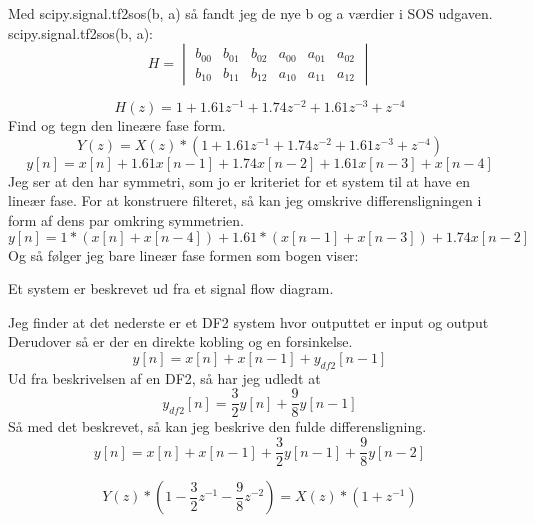 \begin{Opgaver}
\begin{kapitel}
\begin{Opgave}
            Med scipy.signal.tf2sos(b, a) så fandt jeg de nye b og a værdier i SOS udgaven. \\
            scipy.signal.tf2sos(b, a): 
            \[H =  
                \begin{vmatrix}
                    b_{00} & b_{01} & b_{02} & a_{00} & a_{01} & a_{02} \\
                    b_{10} & b_{11} & b_{12} & a_{10} & a_{11} & a_{12}
                \end{vmatrix}
            \]
        \end{Opgave}
        \begin{Opgave}
            \[H(z) = 1 + 1.61z^{-1} + 1.74z^{-2} + 1.61z^{-3} + z^{-4}\]
            Find og tegn den lineære fase form. 
            \[Y(z) = X(z) * (1 + 1.61z^{-1} + 1.74z^{-2} + 1.61z^{-3} + z^{-4})\]
            \[y[n] = x[n] + 1.61x[n - 1] + 1.74x[n - 2] + 1.61x[n - 3] + x[n - 4]\]
            Jeg ser at den har symmetri, som jo er kriteriet for et system til at have en lineær fase. 
            For at konstruere filteret, så kan jeg omskrive differensligningen i form af dens par omkring symmetrien. 
            \[y[n] = 1 * (x[n] + x[n - 4]) + 1.61 * (x[n - 1] + x[n - 3])  + 1.74x[n - 2]\]
            Og så følger jeg bare lineær fase formen som bogen viser: 
        \end{Opgave}
        \begin{Opgave}[Opgave 9.28]
            Et system er beskrevet ud fra et signal flow diagram. 
            \begin{UnderOpgave}
                Jeg finder at det nederste er et DF2 system hvor outputtet er input og output
                Derudover så er der en direkte kobling og en forsinkelse. 
                \[y[n] = x[n] + x[n - 1] + y_{df2}[n - 1]\]
                Ud fra beskrivelsen af en DF2, så har jeg udledt at 
                \[y_{df2}[n] = \frac{3}{2}y[n] + \frac{9}{8}y[n - 1]\]
                Så med det beskrevet, så kan jeg beskrive den fulde differensligning. 
                \[y[n] = x[n] + x[n - 1] + \frac{3}{2}y[n - 1] + \frac{9}{8}y[n - 2]\]
            \end{UnderOpgave}
            \begin{UnderOpgave}
                \[Y(z)*(1 - \frac{3}{2}z^{-1} -\frac{9}{8}z^{-2}) = X(z)*(1 + z^{-1})\]

\end{UnderOpgave}
\end{Opgave}
\end{kapitel}
\end{Opgaver}
